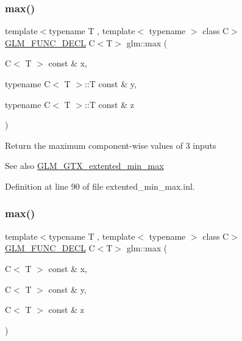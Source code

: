 \subsubsection{\texorpdfstring{max()}{max()}\hspace{0.1cm}{\footnotesize\ttfamily [2/6]}}
{\footnotesize\ttfamily template$<$typename T , template$<$ typename $>$ class C$>$ \\
\hyperlink{setup_8hpp_ab2d052de21a70539923e9bcbf6e83a51}{G\+L\+M\+\_\+\+F\+U\+N\+C\+\_\+\+D\+E\+CL} C$<$T$>$ glm\+::max (\begin{DoxyParamCaption}\item[{C$<$ T $>$ const \&}]{x,  }\item[{typename C$<$ T $>$\+::T const \&}]{y,  }\item[{typename C$<$ T $>$\+::T const \&}]{z }\end{DoxyParamCaption})}

Return the maximum component-\/wise values of 3 inputs \begin{DoxySeeAlso}{See also}
\hyperlink{group__gtx__extented__min__max}{G\+L\+M\+\_\+\+G\+T\+X\+\_\+extented\+\_\+min\+\_\+max} 
\end{DoxySeeAlso}


Definition at line 90 of file extented\+\_\+min\+\_\+max.\+inl.

\mbox{\label{group__gtx__extented__min__max_gaf832e9d4ab4826b2dda2fda25935a3a4}} 
\subsubsection{\texorpdfstring{max()}{max()}\hspace{0.1cm}{\footnotesize\ttfamily [3/6]}}
{\footnotesize\ttfamily template$<$typename T , template$<$ typename $>$ class C$>$ \\
\hyperlink{setup_8hpp_ab2d052de21a70539923e9bcbf6e83a51}{G\+L\+M\+\_\+\+F\+U\+N\+C\+\_\+\+D\+E\+CL} C$<$T$>$ glm\+::max (\begin{DoxyParamCaption}\item[{C$<$ T $>$ const \&}]{x,  }\item[{C$<$ T $>$ const \&}]{y,  }\item[{C$<$ T $>$ const \&}]{z }\end{DoxyParamCaption})}

